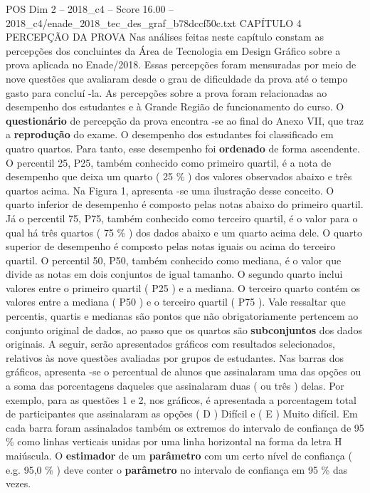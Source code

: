 \begin{textsample}{POS Dim 2 – 2018\_c4 – Score 16.00 – 2018\_c4/enade\_2018\_tec\_des\_graf\_b78dccf50c.txt}  \label{ex:f2_pos_060}
CAPÍTULO 4 PERCEPÇÃO DA PROVA Nas análises feitas neste capítulo constam as percepções dos concluintes da Área de Tecnologia em Design Gráfico sobre a prova aplicada no Enade/2018.
Essas percepções foram mensuradas por meio de nove questões que avaliaram desde o grau de dificuldade da prova até o tempo gasto para concluí -la.
As percepções sobre a prova foram relacionadas ao desempenho dos estudantes e à Grande Região de funcionamento do curso.
O \textbf{questionário} de percepção da prova encontra -se ao final do Anexo VII, que traz a \textbf{reprodução} do exame.
O desempenho dos estudantes foi classificado em quatro quartos.
Para tanto, esse desempenho foi \textbf{ordenado} de forma ascendente.
O percentil 25, P25, também conhecido como primeiro quartil, é a nota de desempenho que deixa um quarto ( 25 \% ) dos valores observados abaixo e três quartos acima.
Na Figura 1, apresenta -se uma ilustração desse conceito.
O quarto inferior de desempenho é composto pelas notas abaixo do primeiro quartil.
Já o percentil 75, P75, também conhecido como terceiro quartil, é o valor para o qual há três quartos ( 75 \% ) dos dados abaixo e um quarto acima dele.
O quarto superior de desempenho é composto pelas notas iguais ou acima do terceiro quartil.
O percentil 50, P50, também conhecido como mediana, é o valor que divide as notas em dois conjuntos de igual tamanho.
O segundo quarto inclui valores entre o primeiro quartil ( P25 ) e a mediana.
O terceiro quarto contém os valores entre a mediana ( P50 ) e o terceiro quartil ( P75 ).
Vale ressaltar que percentis, quartis e medianas são pontos que não obrigatoriamente pertencem ao conjunto original de dados, ao passo que os quartos são \textbf{subconjuntos} dos dados originais.
A seguir, serão apresentados gráficos com resultados selecionados, relativos às nove questões avaliadas por grupos de estudantes.
Nas barras dos gráficos, apresenta -se o percentual de alunos que assinalaram uma das opções ou a soma das porcentagens daqueles que assinalaram duas ( ou três ) delas.
Por exemplo, para as questões 1 e 2, nos gráficos, é apresentada a porcentagem total de participantes que assinalaram as opções ( D ) Difícil e ( E ) Muito difícil.
Em cada barra foram assinalados também os extremos do intervalo de confiança de 95 \% como linhas verticais unidas por uma linha horizontal na forma da letra H maiúscula.
O \textbf{estimador} de um \textbf{parâmetro} com um certo nível de confiança ( e.g. 95,0 \% ) deve conter o \textbf{parâmetro} no intervalo de confiança em 95 \% das vezes.

\end{textsample}
